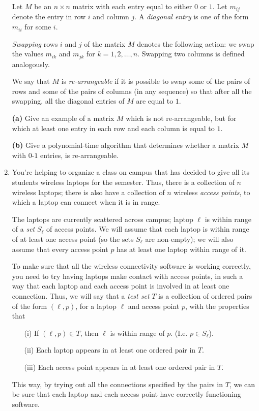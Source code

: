 \documentclass[12pt]{article}
\begin{document}
\begin{enumerate}
Let $M$ be an $n \times n$ matrix with each entry equal to
either $0$ or $1$.
Let $m_{ij}$ denote the entry in row $i$ and column $j$.
A {\em diagonal entry} is one of the form $m_{ii}$ for some $i$.

{\em Swapping} rows $i$ and $j$ of the matrix $M$ denotes
the following action:
we swap the values $m_{ik}$ and $m_{jk}$ for $k = 1, 2, \ldots, n$.
Swapping two columns is defined analogously.

We say that $M$ is {\em re-arrangeable} if it is possible
to swap some of the pairs of rows and some of the pairs of
columns (in any sequence) so that after all the swapping,
all the diagonal entries of $M$ are equal to $1$.

{\bf (a)} 
Give an example of a matrix $M$ which is not re-arrangeable,
but for which at least one entry in each row and each column
is equal to $1$.

{\bf (b)} 
Give a polynomial-time algorithm that determines 
whether a matrix $M$ with $0$-$1$ entries,
is re-arrangeable.


\item 

You're helping to organize a class on campus that
has decided to give all its students wireless laptops for the semester.
Thus, there is a collection of $n$ wireless laptops;
there is also have a collection of $n$ wireless {\em access points},
to which a laptop can connect when it is in range.

The laptops are currently scattered across campus;
laptop $\ell$ is within range of a {\em set} $S_\ell$ of access points.
We will assume that each laptop is within range of at least
one access point (so the sets $S_\ell$ are non-empty);
we will also assume that every access point $p$ has at least
one laptop within range of it.

To make sure that all the wireless connectivity software is
working correctly, you need to try having laptops
make contact with access points, in such a way that
each laptop and each access point is involved in at least one connection.
Thus, we will say that a {\em test set} $T$ is a collection
of ordered pairs of the form $(\ell,p)$, for a laptop $\ell$
and access point $p$, with the properties that
\begin{itemize}
\item[(i)] If $(\ell,p) \in T$, then $\ell$ is within range of
$p$.  (I.e. $p \in S_\ell$).
\item[(ii)] Each laptop appears in at least one ordered pair in $T$.
\item[(iii)] Each access point appears in at least one ordered pair in $T$.
\end{itemize}
This way, by trying out all the connections specified by the pairs in $T$,
we can be sure that each laptop and each access point
have correctly functioning software.


\end{enumerate}
\end{document}
